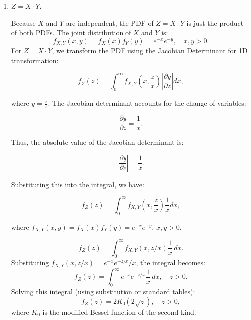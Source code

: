 \documentclass[a4paper, 8pt]{article}
\begin{document}
\begin{enumerate}[label=\alph*)]
          \begin{enumerate}[label=\roman*)]
              \item \textbf{$Z = X \cdot Y$.}

                    Because $X$ and $Y$ are independent, the PDF of $Z = X \cdot Y$ is just the product of both PDFs. The joint distribution of $X$ and $Y$ is:
                    \[
                        f_{X,Y}(x, y) = f_X(x) f_Y(y) = e^{-x} e^{-y}, \quad x, y > 0.
                    \]
                    For $Z = X \cdot Y$, we transform the PDF using the Jacobian Determinant for 1D transformation:


                    \[
                        f_Z(z) = \int_0^\infty f_{X,Y}\left(x, \frac{z}{x}\right) \left|\frac{\partial y}{\partial z}\right| dx,
                    \]

                    where \( y = \frac{z}{x} \). The Jacobian determinant accounts for the change of variables:

                    \[
                        \frac{\partial y}{\partial z} = \frac{1}{x}.
                    \]

                    Thus, the absolute value of the Jacobian determinant is:

                    \[
                        \left|\frac{\partial y}{\partial z}\right| = \frac{1}{x}.
                    \]

                    Substituting this into the integral, we have:

                    \[
                        f_Z(z) = \int_0^\infty f_{X,Y}\left(x, \frac{z}{x}\right) \frac{1}{x} dx,
                    \]

                    where \( f_{X,Y}(x, y) = f_X(x) f_Y(y) = e^{-x} e^{-y}, \, x, y > 0 \).


                    \[
                        f_Z(z) = \int_0^\infty f_{X,Y}(x, z/x) \frac{1}{x} \, dx.
                    \]
                    Substituting \( f_{X,Y}(x, z/x) = e^{-x} e^{-z/x} / x \), the integral becomes:
                    \[
                        f_Z(z) = \int_0^\infty e^{-x} e^{-z/x} \frac{1}{x} \, dx, \quad z > 0.
                    \]
                    Solving this integral (using substitution or standard tables):
                    \[
                        f_Z(z) = 2 K_0(2 \sqrt{z}), \quad z > 0,
                    \]
                    where \( K_0 \) is the modified Bessel function of the second kind.


\end{enumerate}
\end{enumerate}
\end{document}
